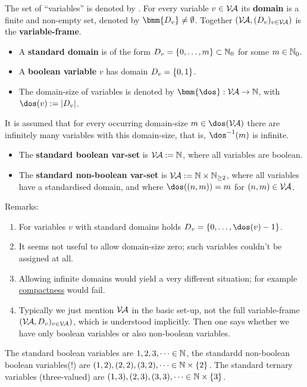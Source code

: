 \documentclass[12pt]{book}
\begin{document}
\begin{defi}\label{def:var}
      The set of ``variables'' is denoted by \bmm{\Va}. For every variable $v \in \mathcal{V\hspace{-0.1em}A}$ its \textbf{domain} is a finite and non-empty set, denoted by 
	  $\bmm{D_v} \ne \es$. Together $(\mathcal{V\hspace{-0.1em}A}, (D_v)_{v \in \mathcal{V\hspace{-0.1em}A}})$ is the \textbf{variable-frame}.
      \begin{itemize}
            \item A \textbf{standard domain} is of the form $D_v = \{ 0, \dots, m \} \subset \mathbb{N}_0$ for some $m \in \mathbb{N}_0$.
            \item A \textbf{boolean variable} $v$ has domain $D_v = \{ 0,1 \}$.
            \item The domain-size of variables is denoted by $\bmm{\dos}: \Va \ra \NN$, with $\dos(v) := \abs{D_v}$.
      \end{itemize}
      It is assumed that for every occurring domain-size $m \in \dos(\Va)$ there are infinitely many variables with this domain-size, that is, $\dos^{-1}(m)$ is infinite.
      \begin{itemize}
            \item The \textbf{standard boolean var-set} is $\mathcal{V\hspace{-0.1em}A} := \mathbb{N}$, where all variables are boolean.
            \item The \textbf{standard non-boolean var-set} is $\mathcal{V\hspace{-0.1em}A} := \mathbb{N} \times \mathbb{N}_{\ge2}$, where all variables have a standardised domain, and where 
			$\dos((n,m)) = m$ for $(n,m) \in \mathcal{V\hspace{-0.1em}A}$.
      \end{itemize}
\end{defi}
Remarks:
\begin{enumerate}
      \item For variables $v$ with standard domains holds $D_v = \tb{0}{\dos(v)-1}$.
      \item It seems not useful to allow domain-size zero; such variables couldn't be assigned at all.
      \item Allowing infinite domains would yield a very different situation; for example \href{https://en.wikipedia.org/wiki/Compact_space}{compactness} would fail.
      \item Typically we just mention $\mathcal{V\hspace{-0.1em}A}$ in the basic set-up, not the full variable-frame $(\mathcal{V\hspace{-0.1em}A},
      D_v)_{v \in \mathcal{V\hspace{-0.1em}A}})$, which is understood implicitly. Then one says whether we have only boolean variables or also non-boolean variables.
\end{enumerate}

\begin{examp}\label{exp:var}
      The standard boolean variables are $1, 2, 3, \dots \in \mathbb{N}$, the standardd non-boolean boolean variables(!) are $(1,2), (2,2), (3,2), \dots \in \mathbb{N} \times \{ 2 \}$. 
	  The standard ternary variables (three-valued) are $(1,3), (2,3), (3,3), \dots \in \mathbb{N} \times \{ 3 \}$.
\end{examp}
\end{document}
